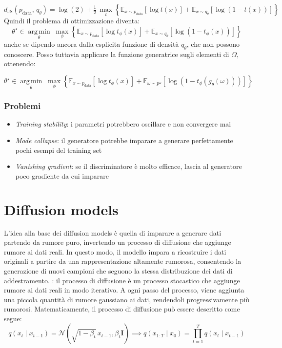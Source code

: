 \[
	d_{\mathrm{JS}} \left(p_{\text{data}},\, q_{\theta}\right)
	= \log \left(2\right)
	+ \tfrac{1}{2}\, \max_{t}
	\left\{
	\mathbb{E}_{x \sim p_{\text{data}}} \left[\log t(x)\right]
	+
	\mathbb{E}_{x \sim q_{\theta}} \left[\log \left(1 - t(x)\right)\right]
	\right\}
\]
Quindi il problema di ottimizzazione diventa:
\[
	\theta^{\star} \in \operatorname*{arg\,min}_{\theta}\;
	\max_{\phi}
	\left\{
	\mathbb{E}_{x \sim p_{\text{data}}} \left[\log t_{\phi}(x)\right]
	+
	\mathbb{E}_{x \sim q_{\theta}} \left[\log \left(1 - t_{\phi}(x)\right)\right]
	\right\}
\]
anche se dipendo ancora dalla esplicita funzione di densità $ q_{\theta} $, che non possono conoscere. Posso tuttavia applicare la funzione generatrice sugli elementi di $ \Omega  $, ottenendo:
\begin{tcolorbox}
	\[
		\theta^{\star} \in \operatorname*{arg\,min}_{\theta}\;
		\max_{\phi}
		\left\{
		\mathbb{E}_{x \sim p_{\text{data}}} \left[\log t_{\phi}(x)\right]
		+
		\mathbb{E}_{\omega \sim p^{\omega}} \left[\log \left(1 - t_{\phi}(g_{\theta }\left(\omega \right))\right)\right]
		\right\}
	\]
\end{tcolorbox}
\subsubsection{Problemi}
\begin{itemize}
	\item \textit{Training stability}: i parametri potrebbero oscillare e non convergere mai
	\item \textit{Mode collapse}: il generatore potrebbe imparare a generare perfettamente pochi esempi del training set
	\item \textit{Vanishing gradient}: se il discriminatore è molto efficace, lascia al generatore poco gradiente da cui imparare
\end{itemize}

\section{Diffusion models}
L'idea alla base dei diffusion models è quella di imparare a generare dati partendo da rumore puro, invertendo un processo di diffusione che aggiunge rumore ai dati reali. In questo modo, il modello impara a ricostruire i dati originali a partire da una rappresentazione altamente rumorosa, consentendo la generazione di nuovi campioni che seguono la stessa distribuzione dei dati di addestramento.
\vskip3mm
: il processo di diffusione è un processo stocastico che aggiunge rumore ai dati reali in modo iterativo. A ogni passo del processo, viene aggiunta una piccola quantità di rumore gaussiano ai dati, rendendoli progressivamente più rumorosi. Matematicamente, il processo di diffusione può essere descritto come segue:
\[
	q(x_t \mid x_{t-1}) = \mathcal{N}(\sqrt{1 - \beta_t} \, x_{t-1}, \beta_t \mathbf{I}) \implies q(x_{1:T} \mid x_0) = \prod_{t=1}^{T} q(x_t \mid x_{t-1})
\]

